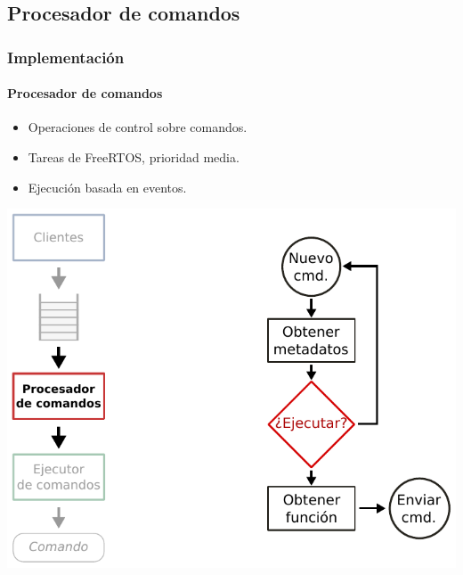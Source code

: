 \documentclass[xcolor=dvipsnames]{beamer}
\begin{document}
    \subsection{Procesador de comandos}
    \begin{frame}
        \frametitle{Implementación}
        \framesubtitle{Procesador de comandos}
        
        \begin{itemize}
            \item Operaciones de control sobre comandos.
            \item Tareas de FreeRTOS, prioridad media.
            \item Ejecución basada en eventos.
        \end{itemize}
        
        \begin{center}
            \includegraphics[height=0.75\textheight]{img/implementacion_dispatcher.pdf}
        \end{center}
        
    \end{frame}
    
\end{document}
